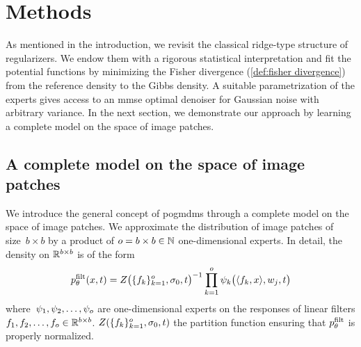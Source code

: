 \section{Methods}%
\label{sec:methods pogmdm}
As mentioned in the introduction, we revisit the classical ridge-type structure of regularizers.
We endow them with a rigorous statistical interpretation and fit the potential functions by minimizing the Fisher divergence (\cref{def:fisher divergence}) from the reference density to the Gibbs density.
A suitable parametrization of the experts gives access to an \gls{mmse} optimal denoiser for Gaussian noise with arbitrary variance.
In the next section, we demonstrate our approach by learning a complete model on the space of image patches.
\subsection{A complete model on the space of image patches}%
\label{ssec:patch model}
We introduce the general concept of \glspl{pogmdm} through a complete model on the space of image patches.
We approximate the distribution of image patches of size~\( b\times b \) by a product of \( o = b \times b \in \mathbb{N} \) one-dimensional experts.
In detail, the density on \( \mathbb{R}^{b\times b} \) is of the form
\begin{equation}
	p^{\mathrm{filt}}_\theta(x, t) = Z \bigl( \{ f_k \}_{k=\num{1}}^o, \sigma_{\num{0}}, t \bigr)^{-1}\prod_{k=\num{1}}^o \psi_k \bigl(\langle f_k, x \rangle, w_j, t\bigr)
	\label{eq:gmdm patch}
\end{equation}
where~\( \psi_{\num{1}}, \psi_{\num{2}}, \dotsc, \psi_o \) are one-dimensional experts on the responses of linear filters \( f_{\num{1}}, f_{\num{2}}, \dotsc, f_o \in \mathbb{R}^{b \times b} \).
\( Z(\{ f_k \}_{k=\num{1}}^o,\sigma_{\num{0}}, t) \) the partition function ensuring that \( p^{\mathrm{filt}}_\theta \) is properly normalized.

